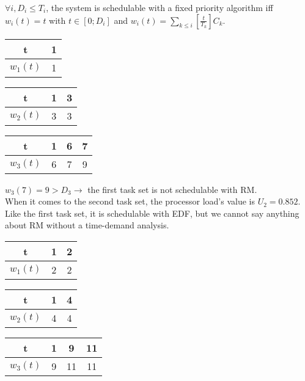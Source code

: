 $\forall i, D_i \leq T_i$, the system is schedulable with a fixed priority algorithm iff $w_i(t) = t$ with $t \in [0;D_i]$ and $w_i(t) = \sum_{k \leq i} \left[ \frac{t}{T_k} \right] C_k$. \\

\begin{center}
	\begin{tabular}{|c|c|}
		\hline
		t & 1 \\
		\hline
		$w_1(t)$ & 1 \\
		\hline
	\end{tabular}
	\quad
	\begin{tabular}{|c|c|c|}
		\hline
		t & 1 & 3\\
		\hline
		$w_2(t)$ & 3 & 3 \\
		\hline
	\end{tabular}
	\quad
	\begin{tabular}{|c|c|c|c|}
		\hline
		t & 1 & 6 & 7\\
		\hline
		$w_3(t)$ & 6 & 7 & 9 \\
		\hline
	\end{tabular}
\end{center}

\noindent $w_3(7) = 9 > D_3 \rightarrow$ the first task set is not schedulable with RM.\\

When it comes to the second task set, the processor load's value is $U_2 = 0.852$. Like the first task set, it is schedulable with EDF, but we cannot say anything about RM without a time-demand analysis. \\

\begin{center}
	\begin{tabular}{|c|c|c|}
		\hline
		t & 1 & 2 \\
		\hline
		$w_1(t)$ & 2 & 2 \\
		\hline
	\end{tabular}
	\quad
	\begin{tabular}{|c|c|c|}
		\hline
		t & 1 & 4\\
		\hline
		$w_2(t)$ & 4 & 4 \\
		\hline
	\end{tabular}
	\quad
	\begin{tabular}{|c|c|c|c|}
		\hline
		t & 1 & 9 & 11\\
		\hline
		$w_3(t)$ & 9 & 11 & 11 \\
		\hline
	\end{tabular}
\end{center}


